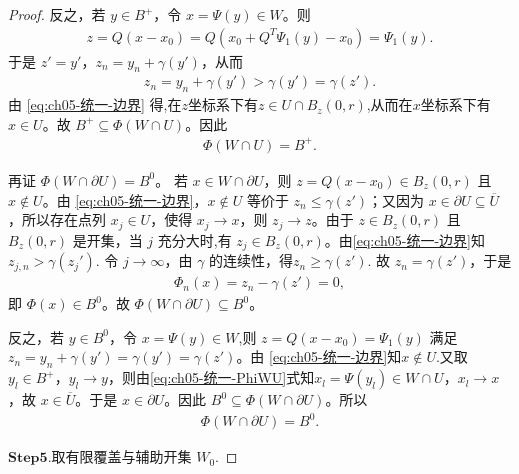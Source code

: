 \documentclass[../../main.tex]{subfiles}
\begin{document}
\begin{proof}
反之，若 $y\in B^{+}$，令 $x=\Psi(y)\in W$。则
\begin{align*}
z=Q(x-x_0)=Q(x_0+Q^{T}\Psi_1(y)-x_0)=\Psi_1(y).
\end{align*}
于是 $z'=y'$，$z_n=y_n+\gamma(y')$，从而
\begin{align*}
z_n=y_n+\gamma(y')>\gamma(y')=\gamma(z').
\end{align*}
由 \eqref{eq:ch05-统一-边界} 得,在$z$坐标系下有$z\in U\cap B_z(0,r)$,从而在$x$坐标系下有$x\in U$。故 $B^{+}\subseteq\Phi(W\cap U)$。因此
\begin{align}
\Phi(W\cap U)=B^{+}.
\label{eq:ch05-统一-PhiWU}
\end{align}

再证 $\Phi(W\cap\partial U)=B^{0}$。
若 $x\in W\cap\partial U$，则 $z=Q(x-x_0)\in B_z(0,r)$ 且 $x\notin U$。由 \eqref{eq:ch05-统一-边界}，$x\notin U$ 等价于 $z_n\leqslant\gamma(z')$；又因为 $x\in\partial U\subseteq\overline U$，所以存在点列 $x_j\in U$，使得 $x_j\to x$，则 $z_j\to z$。由于 $z\in B_z(0,r)$ 且 $B_z(0,r)$ 是开集，当 $j$ 充分大时,有 $z_j\in B_z(0,r)$。由\eqref{eq:ch05-统一-边界}知
$z_{j,n}>\gamma(z_j').$
令 $j\to\infty$，由 $\gamma$ 的连续性，得$z_n\geqslant\gamma(z').$
故 $z_n=\gamma(z')$，于是
\begin{align*}
\Phi_n(x)=z_n-\gamma(z')=0,
\end{align*}
即 $\Phi(x)\in B^{0}$。故 $\Phi(W\cap\partial U)\subseteq B^{0}$。

反之，若 $y\in B^{0}$，令 $x=\Psi(y)\in W$,则 $z=Q(x-x_0)=\Psi_1(y)$ 满足 $z_n=y_n+\gamma(y')=\gamma(y')=\gamma(z')$。由 \eqref{eq:ch05-统一-边界}知$x\notin U$.又取 $y_l\in B^{+}$，$y_l\to y$，则由\eqref{eq:ch05-统一-PhiWU}式知$x_l=\Psi(y_l)\in W\cap U$，$x_l\to x$，故 $x\in\overline{U}$。于是 $x\in\partial U$。因此 $B^{0}\subseteq\Phi(W\cap\partial U)$。所以
\begin{align}
\Phi(W\cap\partial U)=B^{0}.
\label{eq:ch05-统一-PhiWbU}
\end{align}

\noindent$\mathbf{Step}\bm{5}$.{\heiti 取有限覆盖与辅助开集 $W_0$.}


\end{proof}
\end{document}
